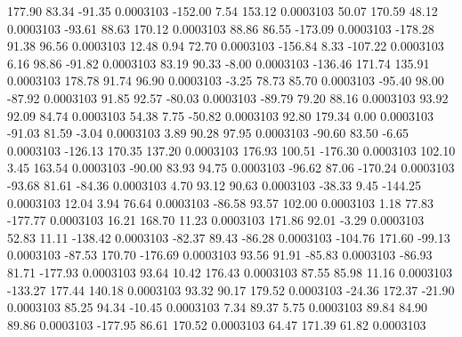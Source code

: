       177.90       83.34      -91.35     0.0003103
     -152.00        7.54      153.12     0.0003103
       50.07      170.59       48.12     0.0003103
      -93.61       88.63      170.12     0.0003103
       88.86       86.55     -173.09     0.0003103
     -178.28       91.38       96.56     0.0003103
       12.48        0.94       72.70     0.0003103
     -156.84        8.33     -107.22     0.0003103
        6.16       98.86      -91.82     0.0003103
       83.19       90.33       -8.00     0.0003103
     -136.46      171.74      135.91     0.0003103
      178.78       91.74       96.90     0.0003103
       -3.25       78.73       85.70     0.0003103
      -95.40       98.00      -87.92     0.0003103
       91.85       92.57      -80.03     0.0003103
      -89.79       79.20       88.16     0.0003103
       93.92       92.09       84.74     0.0003103
       54.38        7.75      -50.82     0.0003103
       92.80      179.34        0.00     0.0003103
      -91.03       81.59       -3.04     0.0003103
        3.89       90.28       97.95     0.0003103
      -90.60       83.50       -6.65     0.0003103
     -126.13      170.35      137.20     0.0003103
      176.93      100.51     -176.30     0.0003103
      102.10        3.45      163.54     0.0003103
      -90.00       83.93       94.75     0.0003103
      -96.62       87.06     -170.24     0.0003103
      -93.68       81.61      -84.36     0.0003103
        4.70       93.12       90.63     0.0003103
      -38.33        9.45     -144.25     0.0003103
       12.04        3.94       76.64     0.0003103
      -86.58       93.57      102.00     0.0003103
        1.18       77.83     -177.77     0.0003103
       16.21      168.70       11.23     0.0003103
      171.86       92.01       -3.29     0.0003103
       52.83       11.11     -138.42     0.0003103
      -82.37       89.43      -86.28     0.0003103
     -104.76      171.60      -99.13     0.0003103
      -87.53      170.70     -176.69     0.0003103
       93.56       91.91      -85.83     0.0003103
      -86.93       81.71     -177.93     0.0003103
       93.64       10.42      176.43     0.0003103
       87.55       85.98       11.16     0.0003103
     -133.27      177.44      140.18     0.0003103
       93.32       90.17      179.52     0.0003103
      -24.36      172.37      -21.90     0.0003103
       85.25       94.34      -10.45     0.0003103
        7.34       89.37        5.75     0.0003103
       89.84       84.90       89.86     0.0003103
     -177.95       86.61      170.52     0.0003103
       64.47      171.39       61.82     0.0003103
